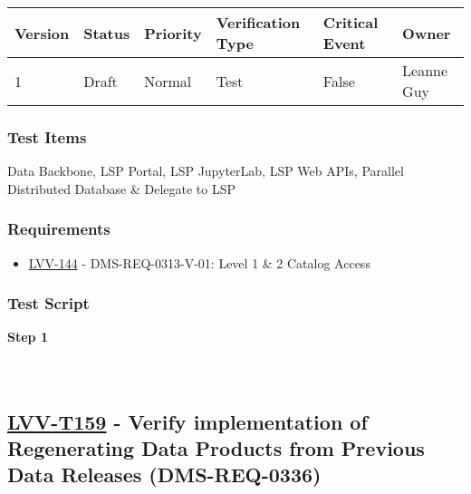 \begin{longtable}[]{@{}llllll@{}}
\toprule
Version & Status & Priority & Verification Type & Critical Event &
Owner\tabularnewline
\midrule
\endhead
1 & Draft & Normal & Test & False & Leanne Guy\tabularnewline
\bottomrule
\end{longtable}

\hypertarget{test-items-134}{%
\subsubsection{Test Items}\label{test-items-134}}

Data Backbone, LSP Portal, LSP JupyterLab, LSP Web APIs, Parallel
Distributed Database \& Delegate to LSP

\hypertarget{requirements-135}{%
\subsubsection{Requirements}\label{requirements-135}}

\begin{itemize}
\tightlist
\item
  \href{https://jira.lsstcorp.org/browse/LVV-144}{LVV-144} -
  DMS-REQ-0313-V-01: Level 1 \& 2 Catalog Access
\end{itemize}

\hypertarget{test-script-135}{%
\subsubsection{Test Script}\label{test-script-135}}

\textbf{Step 1}\\
~\\
~\\

\hypertarget{lvv-t159---verify-implementation-of-regenerating-data-products-from-previous-data-releases-dms-req-0336}{%
\subsection{\texorpdfstring{\href{https://jira.lsstcorp.org/secure/Tests.jspa\#/testCase/LVV-T159}{LVV-T159}
- Verify implementation of Regenerating Data Products from Previous Data
Releases
(DMS-REQ-0336)}{LVV-T159 - Verify implementation of Regenerating Data Products from Previous Data Releases (DMS-REQ-0336)}}\label{lvv-t159---verify-implementation-of-regenerating-data-products-from-previous-data-releases-dms-req-0336}}

